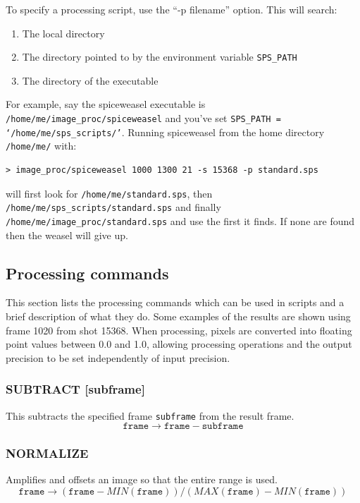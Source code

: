 \documentclass[12pt, a4paper]{article}
\begin{document}
To specify a processing script, use the ``-p filename'' option. This will search:

\begin{enumerate}
  \item The local directory
  \item The directory pointed to by the environment variable \texttt{SPS\_PATH}
  \item The directory of the executable
\end{enumerate}
For example, say the spiceweasel executable is \texttt{/home/me/image\_proc/spiceweasel} and
you've set \texttt{SPS\_PATH = `/home/me/sps\_scripts/'}. Running spiceweasel from the home
directory \texttt{/home/me/} with:

\begin{verbatim}
> image_proc/spiceweasel 1000 1300 21 -s 15368 -p standard.sps
\end{verbatim}

\noindent will first look for \texttt{/home/me/standard.sps}, then \texttt{/home/me/sps\_scripts/standard.sps}
and finally \texttt{/home/me/image\_proc/standard.sps} and use the first it finds. If none are
found then the weasel will give up.

\subsection{Processing commands}
This section lists the processing commands which can be used in scripts and a brief description
of what they do. Some examples of the results are shown using frame 1020 from shot 15368.
When processing, pixels are converted into floating point values between 0.0 and 1.0, allowing
processing operations and the output precision to be set independently of input precision.

\subsubsection{SUBTRACT [subframe]}

This subtracts the specified frame \texttt{subframe} from the result frame.
\[
\texttt{frame} \rightarrow \texttt{frame} - \texttt{subframe}
\]

\subsubsection{NORMALIZE}

Amplifies and offsets an image so that the entire range is used.
\[
\texttt{frame}\rightarrow \left(\texttt{frame} - MIN(\texttt{frame})\right) / \left(MAX(\texttt{frame}) - MIN(\texttt{frame})\right)
\]
\end{document}
